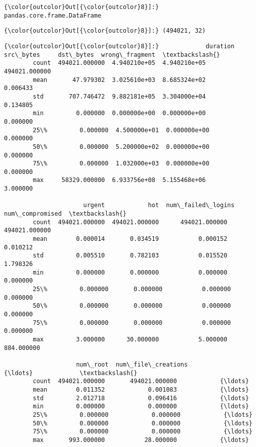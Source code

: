 \documentclass[11pt]{article}
\begin{document}
\begin{Verbatim}[commandchars=\\\{\}]
{\color{outcolor}Out[{\color{outcolor}8}]:} pandas.core.frame.DataFrame
\end{Verbatim}
            
\begin{Verbatim}[commandchars=\\\{\}]
{\color{outcolor}Out[{\color{outcolor}8}]:} (494021, 32)
\end{Verbatim}
            
\begin{Verbatim}[commandchars=\\\{\}]
{\color{outcolor}Out[{\color{outcolor}8}]:}             duration     src\_bytes     dst\_bytes  wrong\_fragment  \textbackslash{}
        count  494021.000000  4.940210e+05  4.940210e+05   494021.000000   
        mean       47.979302  3.025610e+03  8.685324e+02        0.006433   
        std       707.746472  9.882181e+05  3.304000e+04        0.134805   
        min         0.000000  0.000000e+00  0.000000e+00        0.000000   
        25\%         0.000000  4.500000e+01  0.000000e+00        0.000000   
        50\%         0.000000  5.200000e+02  0.000000e+00        0.000000   
        75\%         0.000000  1.032000e+03  0.000000e+00        0.000000   
        max     58329.000000  6.933756e+08  5.155468e+06        3.000000   
        
                      urgent            hot  num\_failed\_logins  num\_compromised  \textbackslash{}
        count  494021.000000  494021.000000      494021.000000    494021.000000   
        mean        0.000014       0.034519           0.000152         0.010212   
        std         0.005510       0.782103           0.015520         1.798326   
        min         0.000000       0.000000           0.000000         0.000000   
        25\%         0.000000       0.000000           0.000000         0.000000   
        50\%         0.000000       0.000000           0.000000         0.000000   
        75\%         0.000000       0.000000           0.000000         0.000000   
        max         3.000000      30.000000           5.000000       884.000000   
        
                    num\_root  num\_file\_creations            {\ldots}             \textbackslash{}
        count  494021.000000       494021.000000            {\ldots}              
        mean        0.011352            0.001083            {\ldots}              
        std         2.012718            0.096416            {\ldots}              
        min         0.000000            0.000000            {\ldots}              
        25\%         0.000000            0.000000            {\ldots}              
        50\%         0.000000            0.000000            {\ldots}              
        75\%         0.000000            0.000000            {\ldots}              
        max       993.000000           28.000000            {\ldots}              
        

\end{Verbatim}
\end{document}
